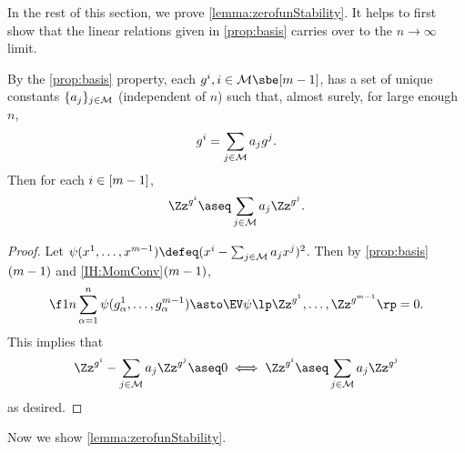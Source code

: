 \documentclass[main.tex]{subfiles}
\begin{document}
In the rest of this section, we prove \cref{lemma:zerofunStability}.
It helps to first show that the linear relations given in \ref{prop:basis} carries over to the $n\to\infty$ limit.
\begin{prop}\label{prop:limitbasis}
By the \ref{prop:basis} property, each $g^i, i \in \coreset \sbe [\MM-1]$, has a set of unique constants $\{a_j\}_{j \in \mathcal{M}}$ (independent of $n$) such that, almost surely, for large enough $n$,
\[g^i = \sum_{j \in \mathcal{M}} a_j g^j.\]
Then for each $i \in [m-1]$,
\[\Zz^{g^i} \aseq \sum_{j \in \coreset} a_j \Zz^{g^j}
.\]
\end{prop}
\begin{proof}

Let $\psi(x^1, \ldots, x^{\MM-1}) \defeq (x^i - \sum_{j \in \coreset} a_j x^j)^2$.
Then by \ref{prop:basis}$(m-1)$ and \ref{IH:MomConv}$(m-1)$,
\begin{align*}
\f 1 n \sum_{\alpha=1}^n \psi(g^1_\alpha, \ldots, g^{\MM-1}_\alpha) \asto \EV \psi\lp \Zz^{g^1}, \ldots, \Zz^{g^{\MM-1}}\rp = 0.
\end{align*}
This implies that
\begin{align*}
\Zz^{g^i} - \sum_{j \in \coreset} a_j \Zz^{g^j} \aseq 0
\iff
\Zz^{g^i} \aseq \sum_{j \in \coreset} a_j \Zz^{g^j}
\end{align*}
as desired.

\end{proof}

Now we show \cref{lemma:zerofunStability}.
\end{document}
